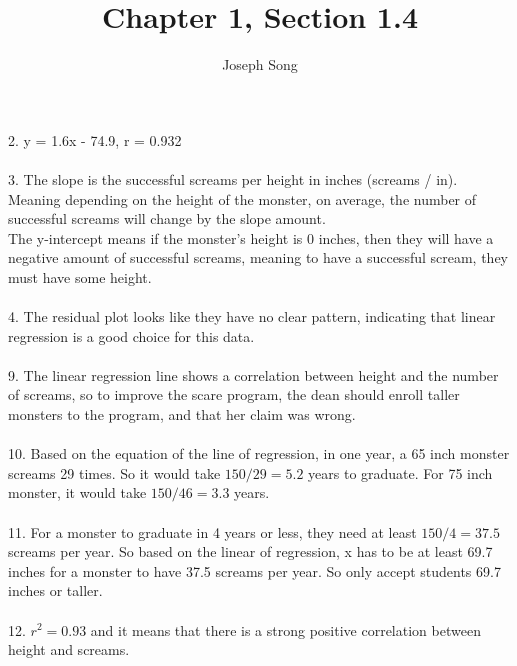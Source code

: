\documentclass{article}
\title{Chapter 1, Section 1.4}
\author{Joseph Song}
\date{}
\begin{document}
2. y = 1.6x - 74.9, r = 0.932
\\
\\
3. The slope is the successful screams per height in inches (screams / in). Meaning depending on the height of the monster, on average, the number of successful screams will change by the slope amount.
\\The y-intercept means if the monster's height is 0 inches, then they will have a negative amount of successful screams, meaning to have a successful scream, they must have some height.
\\
\\
4. The residual plot looks like they have no clear pattern, indicating that linear regression is a good choice for this data.
\\
\\
9. The linear regression line shows a correlation between height and the number of screams, so to improve the scare program, the dean should enroll taller monsters to the program, and that her claim was wrong.
\\
\\ 
10. Based on the equation of the line of regression, in one year, a 65 inch monster screams 29 times. So it would take $150/29 = 5.2$ years to graduate. For 75 inch monster, it would take $150/46 = 3.3$ years.
\\
\\
11. For a monster to graduate in 4 years or less, they need at least $150/4 = 37.5$ screams per year. So based on the linear of regression, x has to be at least 69.7 inches for a monster to have 37.5 screams per year. So only accept students 69.7 inches or taller.
\\
\\
12. $r^2 = 0.93$ and it means that there is a strong positive correlation between height and screams.
\end{document}
